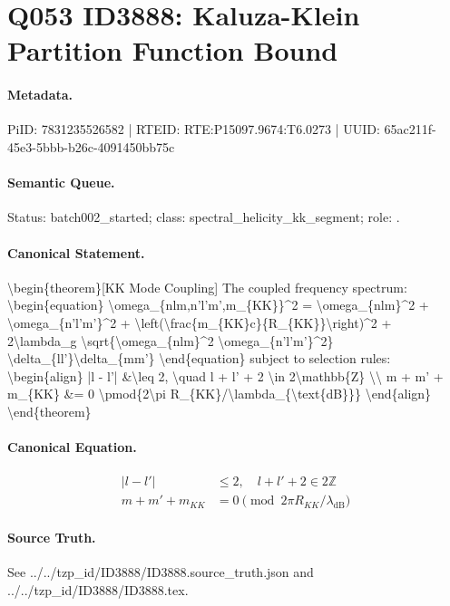 \section*{Q053 ID3888: Kaluza-Klein Partition Function Bound}
\paragraph{Metadata.}
PiID: 7831235526582 | RTEID: RTE:P15097.9674:T6.0273 | UUID: 65ac211f-45e3-5bbb-b26c-4091450bb75c

\paragraph{Semantic Queue.}
Status: batch002\_started; class: spectral\_helicity\_kk\_segment; role: .

\paragraph{Canonical Statement.}
\textbackslash{}begin\{theorem\}[KK Mode Coupling] The coupled frequency spectrum: \textbackslash{}begin\{equation\} \textbackslash{}omega\_\{nlm,n'l'm',m\_\{KK\}\}\textasciicircum{}2 = \textbackslash{}omega\_\{nlm\}\textasciicircum{}2 + \textbackslash{}omega\_\{n'l'm'\}\textasciicircum{}2 + \textbackslash{}left(\textbackslash{}frac\{m\_\{KK\}c\}\{R\_\{KK\}\}\textbackslash{}right)\textasciicircum{}2 + 2\textbackslash{}lambda\_g \textbackslash{}sqrt\{\textbackslash{}omega\_\{nlm\}\textasciicircum{}2 \textbackslash{}omega\_\{n'l'm'\}\textasciicircum{}2\} \textbackslash{}delta\_\{ll'\}\textbackslash{}delta\_\{mm'\} \textbackslash{}end\{equation\} subject to selection rules: \textbackslash{}begin\{align\} |l - l'| \&\textbackslash{}leq 2, \textbackslash{}quad l + l' + 2 \textbackslash{}in 2\textbackslash{}mathbb\{Z\} \textbackslash{}\textbackslash{} m + m' + m\_\{KK\} \&= 0 \textbackslash{}pmod\{2\textbackslash{}pi R\_\{KK\}/\textbackslash{}lambda\_\{\textbackslash{}text\{dB\}\}\} \textbackslash{}end\{align\} \textbackslash{}end\{theorem\}

\paragraph{Canonical Equation.}
\[
\begin{align} |l - l'| &\leq 2, \quad l + l' + 2 \in 2\mathbb{Z} \\ m + m' + m_{KK} &= 0 \pmod{2\pi R_{KK}/\lambda_{\text{dB}}} \end{align}
\]

\paragraph{Source Truth.}
See ../../tzp\_id/ID3888/ID3888.source\_truth.json and ../../tzp\_id/ID3888/ID3888.tex.
